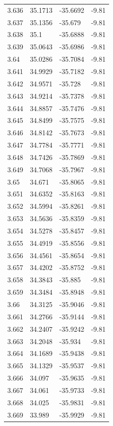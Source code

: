 \begin{tabular}{llll}
3.636 & 35.1713 & -35.6692 & -9.81 \\
3.637 & 35.1356 & -35.679 & -9.81 \\
3.638 & 35.1 & -35.6888 & -9.81 \\
3.639 & 35.0643 & -35.6986 & -9.81 \\
3.64 & 35.0286 & -35.7084 & -9.81 \\
3.641 & 34.9929 & -35.7182 & -9.81 \\
3.642 & 34.9571 & -35.728 & -9.81 \\
3.643 & 34.9214 & -35.7378 & -9.81 \\
3.644 & 34.8857 & -35.7476 & -9.81 \\
3.645 & 34.8499 & -35.7575 & -9.81 \\
3.646 & 34.8142 & -35.7673 & -9.81 \\
3.647 & 34.7784 & -35.7771 & -9.81 \\
3.648 & 34.7426 & -35.7869 & -9.81 \\
3.649 & 34.7068 & -35.7967 & -9.81 \\
3.65 & 34.671 & -35.8065 & -9.81 \\
3.651 & 34.6352 & -35.8163 & -9.81 \\
3.652 & 34.5994 & -35.8261 & -9.81 \\
3.653 & 34.5636 & -35.8359 & -9.81 \\
3.654 & 34.5278 & -35.8457 & -9.81 \\
3.655 & 34.4919 & -35.8556 & -9.81 \\
3.656 & 34.4561 & -35.8654 & -9.81 \\
3.657 & 34.4202 & -35.8752 & -9.81 \\
3.658 & 34.3843 & -35.885 & -9.81 \\
3.659 & 34.3484 & -35.8948 & -9.81 \\
3.66 & 34.3125 & -35.9046 & -9.81 \\
3.661 & 34.2766 & -35.9144 & -9.81 \\
3.662 & 34.2407 & -35.9242 & -9.81 \\
3.663 & 34.2048 & -35.934 & -9.81 \\
3.664 & 34.1689 & -35.9438 & -9.81 \\
3.665 & 34.1329 & -35.9537 & -9.81 \\
3.666 & 34.097 & -35.9635 & -9.81 \\
3.667 & 34.061 & -35.9733 & -9.81 \\
3.668 & 34.025 & -35.9831 & -9.81 \\
3.669 & 33.989 & -35.9929 & -9.81 \\

\end{tabular}
